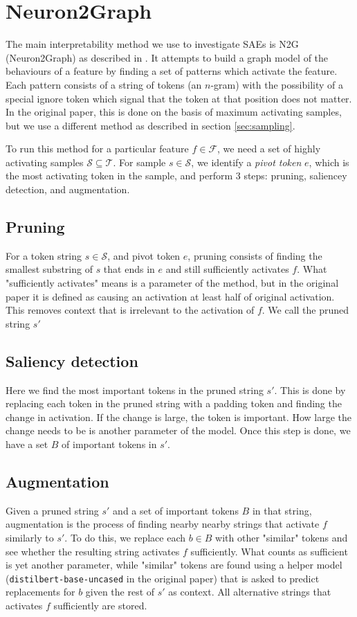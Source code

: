 \section{Neuron2Graph}
\label{sec:n2g}
The main interpretability method we use to investigate SAEs is N2G (Neuron2Graph)
as described in \cite{foote_neuron_2023}.
It attempts to build a graph model of the behaviours of a feature 
by finding a set of patterns which activate the feature.
Each pattern consists of a string of tokens (an $n$-gram) 
with the possibility of a special ignore token 
which signal that the token at that position does not matter.
In the original paper, this is done on the basis of maximum activating samples, but we use a different method as described in section \ref{sec:sampling}.

To run this method for a particular feature $f\in\mathcal{F}$, 
we need a set of highly activating samples $\mathcal S\subseteq \mathcal T$.
For sample $s\in\mathcal S$, we identify a \emph{pivot token} $e$, 
which is the most activating token in the sample, 
and perform 3 steps: pruning, saliencey detection, and augmentation.

\subsection{Pruning}
For a token string $s\in\mathcal S$, and pivot token $e$, 
pruning consists of finding the smallest substring of $s$ that ends in $e$ 
and still sufficiently activates $f$.
What "sufficiently activates" means is a parameter of the method, 
but in the original paper it is defined as causing an activation at least
half of original activation.
This removes context that is irrelevant to the activation of $f$.
We call the pruned string $s'$

\subsection{Saliency detection}
Here we find the most important tokens in the pruned string $s'$.
This is done by replacing each token in the pruned string 
with a padding token and finding the change in activation.
If the change is large, the token is important.
How large the change needs to be is another parameter of the model.
Once this step is done, we have a set $B$ of important tokens in $s'$.

\subsection{Augmentation}
Given a pruned string $s'$ and a set of important tokens $B$ in that string, 
augmentation is the process of finding nearby nearby strings 
that activate $f$ similarly to $s'$.
To do this, we replace each $b\in B$ with other "similar" tokens and 
see whether the resulting string activates $f$ sufficiently.
What counts as sufficient is yet another parameter, 
while "similar" tokens are found using a helper model 
(\verb|distilbert-base-uncased| in the original paper) 
that is asked to predict replacements for $b$ 
given the rest of $s'$ as context.
All alternative strings that activates $f$ sufficiently are stored.

